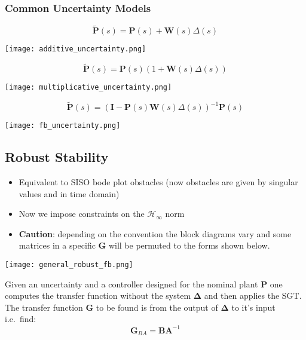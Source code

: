 \subsubsection{Common Uncertainty Models}
\begin{equation*}
    \tilde{\mathbf{P}}(s)=\mathbf{P}(s)+\mathbf{W}(s)\Delta(s)
\end{equation*}
\begin{center}
    \texttt{[image: additive\_uncertainty.png]}
\end{center}

\begin{equation*}
    \tilde{\mathbf{P}}(s)=\mathbf{P}(s)(1+\mathbf{W}(s)\Delta(s))
\end{equation*}
\begin{center}
    \texttt{[image: multiplicative\_uncertainty.png]}
\end{center}
\begin{equation*}
    \tilde{\mathbf{P}}(s)={(\mathbf{I}-\mathbf{P}(s)\mathbf{W}(s)\Delta(s))}^{-1}\mathbf{P}(s)
\end{equation*}
\begin{center}
    \texttt{[image: fb\_uncertainty.png]}
\end{center}

\subsection{Robust Stability}
\begin{itemize}
    \item Equivalent to SISO bode plot obstacles (now obstacles are given by singular values and in time domain)    %
    \item Now we impose constraints on the $\mathcal{H}_{\infty}$ norm
    \item \textbf{Caution}: depending on the convention the block diagrams vary and some matrices in a specific $\mathbf{G}$ will be permuted to the forms shown below.
\end{itemize}


\begin{center}
    \texttt{[image: general\_robust\_fb.png]}
\end{center}
Given an uncertainty and a controller designed for the nominal plant $\mathbf{P}$ one computes the transfer function without the system $\boldsymbol{\Delta}$ and then applies the SGT. The transfer function $\mathbf{G}$ to be found is from the output of $\boldsymbol{\Delta}$ to it's input i.e.\ find:
\begin{equation*}
    \mathbf{G}_{BA}=\mathbf{BA}^{-1}
\end{equation*}

